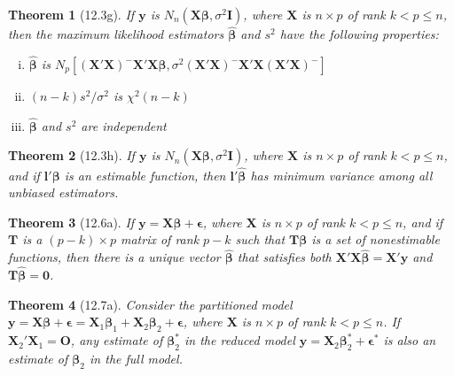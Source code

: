 \documentclass{article}
\newtheorem{theorem}{Theorem}[section]
\begin{document}
\begin{theorem}[12.3g]
If $\mathbf{y}$ is $N_n(\mathbf{X}\boldsymbol{\beta}, \sigma^2\mathbf{I})$, where $\mathbf{X}$ is $n \times p$ of rank $k < p \leq n$, then the maximum likelihood estimators $\hat{\boldsymbol{\beta}}$ and $s^2$ have the following properties:

\begin{enumerate}[(i)]
\item $\hat{\boldsymbol{\beta}}$ is $N_p[(\mathbf{X}'\mathbf{X})^{-}\mathbf{X}'\mathbf{X}\boldsymbol{\beta}, \sigma^2(\mathbf{X}'\mathbf{X})^{-}\mathbf{X}'\mathbf{X}(\mathbf{X}'\mathbf{X})^{-}]$
\item $(n-k)s^2/\sigma^2$ is $\chi^2(n-k)$
\item $\hat{\boldsymbol{\beta}}$ and $s^2$ are independent
\end{enumerate}
\end{theorem}

\begin{theorem}[12.3h]
If $\mathbf{y}$ is $N_n(\mathbf{X}\boldsymbol{\beta}, \sigma^2\mathbf{I})$, where $\mathbf{X}$ is $n \times p$ of rank $k < p \leq n$, and if $\mathbf{l}'\boldsymbol{\beta}$ is an estimable function, then $\mathbf{l}'\hat{\boldsymbol{\beta}}$ has minimum variance among all unbiased estimators.
\end{theorem}

\begin{theorem}[12.6a]
If $\mathbf{y} = \mathbf{X}\boldsymbol{\beta} + \boldsymbol{\epsilon}$, where $\mathbf{X}$ is $n \times p$ of rank $k < p \leq n$, and if $\mathbf{T}$ is a $(p-k) \times p$ matrix of rank $p-k$ such that $\mathbf{T}\boldsymbol{\beta}$ is a set of nonestimable functions, then there is a unique vector $\hat{\boldsymbol{\beta}}$ that satisfies both $\mathbf{X}'\mathbf{X}\hat{\boldsymbol{\beta}} = \mathbf{X}'\mathbf{y}$ and $\mathbf{T}\hat{\boldsymbol{\beta}} = \mathbf{0}$.
\end{theorem}

\begin{theorem}[12.7a]
Consider the partitioned model $\mathbf{y} = \mathbf{X}\boldsymbol{\beta} + \boldsymbol{\epsilon} = \mathbf{X}_1\boldsymbol{\beta}_1 + \mathbf{X}_2\boldsymbol{\beta}_2 + \boldsymbol{\epsilon}$, where $\mathbf{X}$ is $n \times p$ of rank $k < p \leq n$. If $\mathbf{X}_2'\mathbf{X}_1 = \mathbf{O}$, any estimate of $\boldsymbol{\beta}_2^*$ in the reduced model $\mathbf{y} = \mathbf{X}_2\boldsymbol{\beta}_2^* + \boldsymbol{\epsilon}^*$ is also an estimate of $\boldsymbol{\beta}_2$ in the full model.
\end{theorem}
\end{document}
